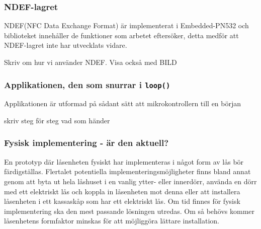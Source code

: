 \documentclass[11pt]{article}
\begin{document}
\subsubsection{NDEF-lagret}
NDEF(NFC Data Exchange Format) är implementerat i Embedded-PN532 och biblioteket innehåller de funktioner som arbetet eftersöker, detta medför att NDEF-lagret inte har utvecklats vidare. 

Skriv om hur vi använder NDEF. Visa också med BILD

\subsubsection{Applikationen, den som snurrar i \texttt{loop()}}
Applikationen är utformad på sådant sätt att mikrokontrollern till en början 

skriv steg för steg vad som händer

\subsubsection{Fysisk implementering - är den aktuell?}
En prototyp där låsenheten fysiskt har implementeras i något form av lås bör färdigställas. Flertalet potentiella implementeringsmöjligheter finns bland annat genom att byta ut hela låshuset i en vanlig ytter- eller innerdörr,  använda en dörr med ett elektriskt lås och koppla in låsenheten mot denna eller att installera låsenheten i ett kassaskåp som har ett elektriskt lås. Om tid finnes för fysisk implementering ska den mest passande lösningen utredas. Om så behövs kommer låsenhetens formfaktor minskas för att möjliggöra lättare installation.
\end{document}
